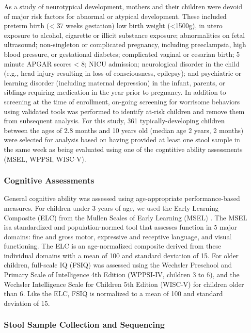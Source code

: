 \documentclass{article}
\begin{document}
As a study of neurotypical development, mothers and their children
were devoid of major risk factors for abnormal or atypical development.
These included preterm birth (< 37 weeks gestation) low birth weight (<1500g),
in utero exposure to alcohol, cigarette or illicit substance exposure;
abnormalities on fetal ultrasound; non-singleton or complicated pregnancy,
including preeclampsia, high blood pressure, or gestational diabetes;
complicated vaginal or cesarian birth; 5 minute APGAR scores < 8;
NICU admission; neurological disorder in the child
(e.g., head injury resulting in loss of consciousness, epilepsy);
and psychiatric or learning disorder (including maternal depression)
in the infant, parents, or siblings requiring medication in the year prior to pregnancy.
In addition to screening at
the time of enrollment, on-going screening for worrisome behaviors using
validated tools was performed to identify at-risk children and remove
them from subsequent analysis.
For this study, 361 typically-developing children between the
ages of 2.8 months and 10 years old (median age 2 years, 2 months) were
selected for analysis based on having provided at least one stool sample
in the same week as being evaluated using one of the cogntitive ability
assessments (MSEL, WPPSI, WISC-V).

\subsubsection*{Cognitive Assessments}

General cognitive ability was assessed using age-appropriate performance-based measures.
For children under 3 years of age, we used the Early Learning
Composite (ELC) from the Mullen Scales of Early Learning (MSEL)
\cite{mullenMullenScalesEarly1995}.
The MSEL isa standardized and population-normed tool that assesses 
function in 5 major domains: fine and gross motor, expressive and receptive language,  
and visual functioning.
The ELC is an age-normalized composite derived from these individual domains
with a mean of 100 and standard deviation of 15. For older children, full-scale IQ (FSIQ)
was assessed using the Wechsler Preschool and Primary Scale of Intelligence 4th Edition
(WPPSI-IV, children 3 to 6)\cite{wechslerWechslerPreschoolPrimary2012},
and the Wechsler Intelligence Scale for Children 5th Edition (WISC-V)
for children older than 6\cite{wechslerWechslerIntelligenceScale1949}. 
Like the ELC, FSIQ is normalized to a mean of 100 and standard deviation of 15.


\subsubsection*{Stool Sample Collection and Sequencing}
\end{document}
